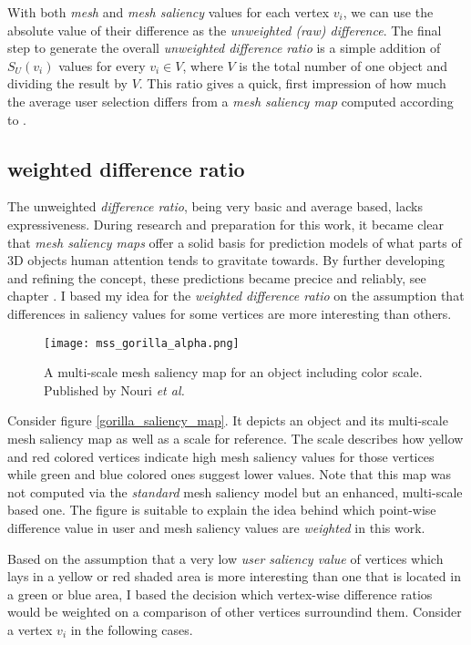With both \textit{mesh} and \textit{mesh saliency} values for each vertex $v_i$, we can use the absolute value of their difference as the \textit{unweighted (raw) difference}. The final step to generate the overall \textit{unweighted difference ratio} is a simple addition of $S_{U}(v_i)$ values for every $v_i \in V$, where $V$ is the total number of one object and dividing the result by $V$. This ratio gives a quick, first impression of how much the average user selection differs from a \textit{mesh saliency map} computed according to \cite{lee2005mesh}.

		\subsection{weighted difference ratio}
		\label{sec:weighted_difference_ratio}
The unweighted \textit{difference ratio}, being very basic and average based, lacks expressiveness. During research and preparation for this work, it became clear that \textit{mesh saliency maps} offer a solid basis for prediction models of what parts of 3D objects human attention tends to gravitate towards. By further developing and refining the concept, these predictions became precice and reliably, see chapter \cite{sec:related_work}. I based my idea for the \textit{weighted difference ratio} on the assumption that differences in saliency values for some vertices are more interesting than others.

\begin{figure}[htb]
  \centering
  \texttt{[image: mss\_gorilla\_alpha.png]}\\ %
  \caption{A multi-scale mesh saliency map for an object including color scale. Published by Nouri \textit{et al.} \cite{nouri2015multi}}\label{fig:gorilla_saliency_map}
\end{figure}

Consider figure \ref{gorilla_saliency_map}. It depicts an object and its multi-scale mesh saliency map as well as a scale for reference. The scale describes how yellow and red colored vertices indicate high mesh saliency values for those vertices while green and blue colored ones suggest lower values. Note that this map was not computed via the \textit{standard} mesh saliency model but an enhanced, multi-scale based one. The figure is suitable to explain the idea behind which point-wise difference value in user and mesh saliency values are \textit{weighted} in this work.

Based on the assumption that a very low \textit{user saliency value} of vertices which lays in a yellow or red shaded area is more interesting than one that is located in a green or blue area, I based the decision which vertex-wise difference ratios would be weighted on a comparison of other vertices surroundind them. Consider a vertex $v_i$ in the following cases.


